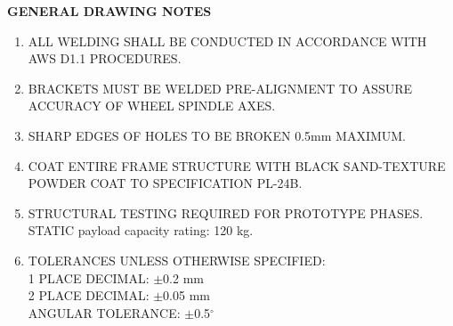 \documentclass[10pt]{article}
\begin{document}
\hfill
\begin{minipage}[t]{6.8cm}
  \vspace{1.2mm}
  {\fontsize{9}{11}\selectfont\sffamily\bfseries\color{CADBlue} GENERAL DRAWING NOTES}
  
  \vspace{3mm}
  {\fontsize{7}{8.5}\selectfont\sffamily
  \begin{enumerate}[noitemsep, topsep=0pt, parsep=0pt, partopsep=0pt, leftmargin=12pt]
    \setlength{\itemsep}{3.5pt}
    \item ALL WELDING SHALL BE CONDUCTED IN ACCORDANCE WITH AWS D1.1 PROCEDURES.
    \item BRACKETS MUST BE WELDED PRE-ALIGNMENT TO ASSURE ACCURACY OF WHEEL SPINDLE AXES.
    \item SHARP EDGES OF HOLES TO BE BROKEN 0.5mm MAXIMUM.
    \item COAT ENTIRE FRAME STRUCTURE WITH BLACK SAND-TEXTURE POWDER COAT TO SPECIFICATION PL-24B.
    \item STRUCTURAL TESTING REQUIRED FOR PROTOTYPE PHASES. STATIC payload capacity rating: 120 kg.
    \item TOLERANCES UNLESS OTHERWISE SPECIFIED:\\[1mm]
      1 PLACE DECIMAL: $\pm$0.2 mm\\
      2 PLACE DECIMAL: $\pm$0.05 mm\\
      ANGULAR TOLERANCE: $\pm$0.5$^\circ$
  \end{enumerate}
  }
\end{minipage}
\end{document}
